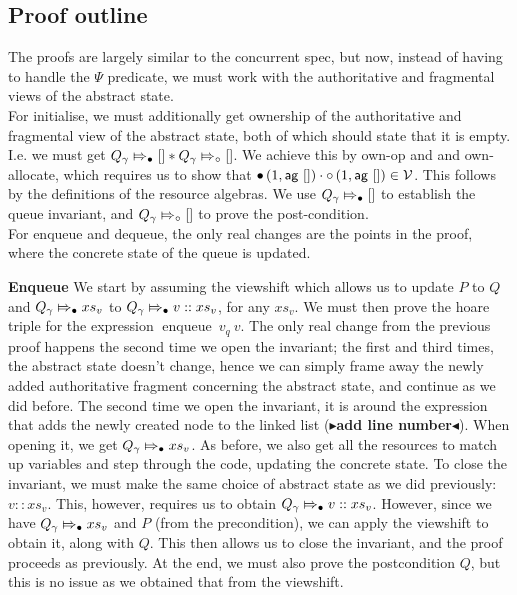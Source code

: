 \documentclass[twoside,11pt,openright]{report}
\newcommand{\enqueue}{\operatorname{enqueue}}
\newcommand{\Qg}{Q_\gname}
\newcommand{\Vl}{\ensuremath{\mathcal{V}}}
\newcommand{\abstractstatefullfrag}[2]{#1 \Mapsto_{\circ} #2}
\newcommand{\abstractstateauth}[2]{#1 \Mapsto_{\bullet} #2}
\newcommand{\todo}[1]{{\color[rgb]{.5,0,0}\textbf{$\blacktriangleright$#1$\blacktriangleleft$}}}
\begin{document}
\subsection{Proof outline}
The proofs are largely similar to the concurrent spec, but now, instead of having to handle the $\Psi$ predicate, we must work with the authoritative and fragmental views of the abstract state.\\
For initialise, we must additionally get ownership of the authoritative and fragmental view of the abstract state, both of which should state that it is empty. I.e. we must get $\abstractstateauth{\Qg}{[]} \ast \abstractstatefullfrag{\Qg}{[]}$. We achieve this by own-op and and own-allocate, which requires us to show that $\authfull (1, \aginj\ []) \cdot \authfrag (1, \aginj\ []) \in \Vl$. This follows by the definitions of the resource algebras. We use $\abstractstateauth{\Qg}{[]}$ to establish the queue invariant, and $\abstractstatefullfrag{\Qg}{[]}$ to prove the post-condition.\\
For enqueue and dequeue, the only real changes are the points in the proof, where the concrete state of the queue is updated. 

\textbf{Enqueue} We start by assuming the viewshift which allows us to update $P$ to $Q$ and $\abstractstateauth{\Qg}{xs_v}$ to $\abstractstateauth{\Qg}{v :: xs_v}$, for any $xs_v$. We must then prove the hoare triple for the expression $\enqueue \ v_q \ v$. The only real change from the previous proof happens the second time we open the invariant; the first and third times, the abstract state doesn't change, hence we can simply frame away the newly added authoritative fragment concerning the abstract state, and continue as we did before. The second time we open the invariant, it is around the expression that adds the newly created node to the linked list (\todo{add line number}). When opening it, we get $\abstractstateauth{\Qg}{xs_v}$. As before, we also get all the resources to match up variables and step through the code, updating the concrete state. To close the invariant, we must make the same choice of abstract state as we did previously: $v :: xs_v$. This, however, requires us to obtain $\abstractstateauth{\Qg}{v :: xs_v}$. However, since we have $\abstractstateauth{\Qg}{xs_v}$ and $P$ (from the precondition), we can apply the viewshift to obtain it, along with $Q$. This then allows us to close the invariant, and the proof proceeds as previously. At the end, we must also prove the postcondition $Q$, but this is no issue as we obtained that from the viewshift.
\end{document}
